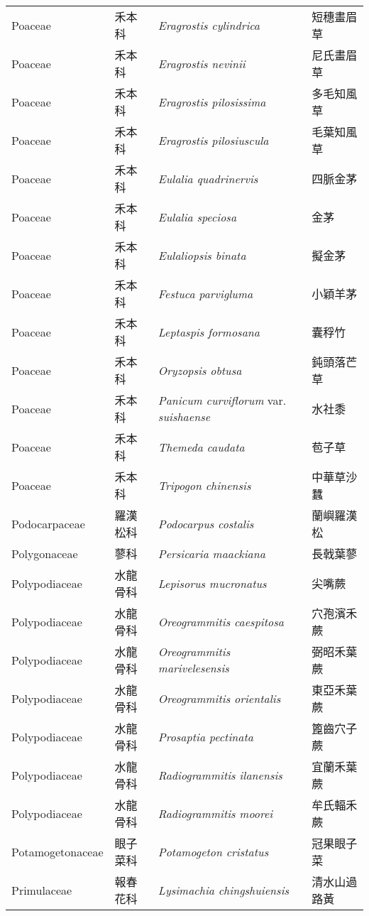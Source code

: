 \begin{longtable}{p{3cm}p{2cm}p{5cm}p{3cm}}
    Poaceae & 禾本科 & \textit{Eragrostis cylindrica}  & 短穗畫眉草\\
    Poaceae & 禾本科 & \textit{Eragrostis nevinii}  & 尼氏畫眉草\\
    Poaceae & 禾本科 & \textit{Eragrostis pilosissima}  & 多毛知風草\\
    Poaceae & 禾本科 & \textit{Eragrostis pilosiuscula}  & 毛葉知風草\\
    Poaceae & 禾本科 & \textit{Eulalia quadrinervis}  & 四脈金茅\\
    Poaceae & 禾本科 & \textit{Eulalia speciosa}  & 金茅\\
    Poaceae & 禾本科 & \textit{Eulaliopsis binata}  & 擬金茅\\
    Poaceae & 禾本科 & \textit{Festuca parvigluma}  & 小穎羊茅\\
    Poaceae & 禾本科 & \textit{Leptaspis formosana}  & 囊稃竹\\
    Poaceae & 禾本科 & \textit{Oryzopsis obtusa}  & 鈍頭落芒草\\
    Poaceae & 禾本科 & \textit{Panicum curviflorum} var. \textit{suishaense}  & 水社黍\\
    Poaceae & 禾本科 & \textit{Themeda caudata}  & 苞子草\\
    Poaceae & 禾本科 & \textit{Tripogon chinensis}  & 中華草沙蠶\\
    Podocarpaceae & 羅漢松科 & \textit{Podocarpus costalis}  & 蘭嶼羅漢松\\
    Polygonaceae & 蓼科 & \textit{Persicaria maackiana}  & 長戟葉蓼\\
    Polypodiaceae & 水龍骨科 & \textit{Lepisorus mucronatus}  & 尖嘴蕨\\
    Polypodiaceae & 水龍骨科 & \textit{Oreogrammitis caespitosa}  & 穴孢濱禾蕨\\
    Polypodiaceae & 水龍骨科 & \textit{Oreogrammitis marivelesensis}  & 弼昭禾葉蕨\\
    Polypodiaceae & 水龍骨科 & \textit{Oreogrammitis orientalis}  & 東亞禾葉蕨\\
    Polypodiaceae & 水龍骨科 & \textit{Prosaptia pectinata}  & 篦齒穴子蕨\\
    Polypodiaceae & 水龍骨科 & \textit{Radiogrammitis ilanensis}  & 宜蘭禾葉蕨\\
    Polypodiaceae & 水龍骨科 & \textit{Radiogrammitis moorei}  & 牟氏輻禾蕨\\
    Potamogetonaceae & 眼子菜科 & \textit{Potamogeton cristatus}  & 冠果眼子菜\\
    Primulaceae & 報春花科 & \textit{Lysimachia chingshuiensis}  & 清水山過路黃\\

\end{longtable}
